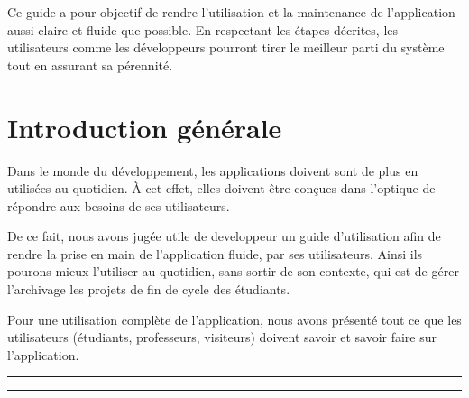 \documentclass[12pt]{article}
\begin{document}
\vspace{0.5cm}

Ce guide a pour objectif de rendre l’utilisation et la maintenance de l’application aussi claire et fluide que possible. En respectant les étapes décrites, les utilisateurs comme les développeurs pourront tirer le meilleur parti du système tout en assurant sa pérennité.

\newpage

\section*{Introduction générale}
Dans le monde du développement, les applications doivent sont de plus en utilisées au quotidien. 
À cet effet, elles doivent être conçues dans l'optique de répondre aux besoins de ses utilisateurs. 


De ce fait, nous avons jugée utile de developpeur un guide d'utilisation afin de rendre la prise en 
main de l'application fluide, par ses utilisateurs. Ainsi ils pourons mieux l'utiliser au quotidien,
sans sortir de son contexte, qui est de gérer l'archivage les projets de fin de cycle des étudiants. 

Pour une utilisation complète de l'application, nous avons présenté tout ce que les utilisateurs 
(étudiants, professeurs, visiteurs) doivent savoir et savoir faire sur l'application.

\vspace{0.5cm}
\rule{\linewidth}{0.2pt}

\rule{\linewidth}{0.2pt}
\end{document}
